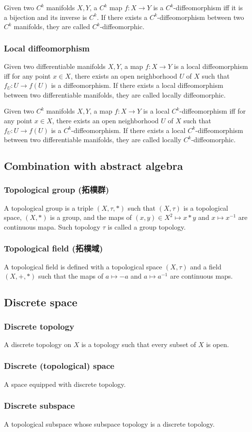 \documentclass[a4paper,12pt]{article}
\begin{document}
Given two $C^k$ manifolds $X,Y$, a $C^k$ map $f\colon X\to Y$ is a $C^k$-diffeomorphism iff it is a bijection and its inverse is $C^k$. If there exists a $C^k$-diffeomorphism between two $C^k$ manifolds, they are called $C^k$-diffeomorphic.
\subsubsection{Local diffeomorphism}
Given two differentiable manifolds $X,Y$, a map $f\colon X\to Y$ is a local diffeomorphism iff for any point $x\in X$, there exists an open neighborhood $U$ of $X$ such that $f_U\colon U\to f(U)$ is a diffeomorphism. If there exists a local diffeomorphism between two differentiable manifolds, they are called locally diffeomorphic.

Given two $C^k$ manifolds $X,Y$, a map $f\colon X\to Y$ is a local $C^k$-diffeomorphism iff for any point $x\in X$, there exists an open neighborhood $U$ of $X$ such that $f_U\colon U\to f(U)$ is a $C^k$-diffeomorphism. If there exists a local $C^k$-diffeomorphism between two differentiable manifolds, they are called locally $C^k$-diffeomorphic.
\subsection{Combination with abstract algebra}
\subsubsection{Topological group (拓樸群)}
A topological group is a triple $(X,\tau,*)$ such that $(X,\tau)$ is a topological space, $(X,*)$ is a group, and the maps of $(x,y)\in X^2\mapsto x*y$ and $x\mapsto x^{-1}$ are continuous mapa. Such topology $\tau$ is called a group topology.
\subsubsection{Topological field (拓樸域)}
A topological field is defined with a topological space $(X,\tau)$ and a field $(X,+,*)$ such that the maps of $a\mapsto -a$ and $a\mapsto a^{-1}$ are continuous maps.
\subsection{Discrete space}
\subsubsection{Discrete topology}
A discrete topology on $X$ is a topology such that every subset of $X$ is open.
\subsubsection{Discrete (topological) space}
A space equipped with discrete topology.
\subsubsection{Discrete subspace}
A topological subspace whose subspace topology is a discrete topology.
\end{document}
